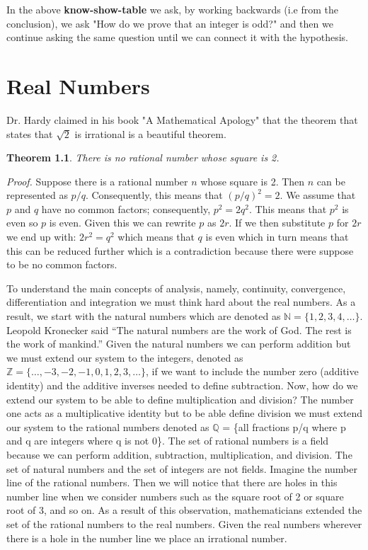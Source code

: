 \documentclass[10pt]{amsbook}
\newtheorem{theorem}{Theorem}
\begin{document}
In the above \textbf{know-show-table} we ask, by working backwards (i.e from the conclusion), we ask "How do we prove that an integer is odd?" and then we continue asking the same question until we can connect it with the hypothesis.




\chapter{Real Numbers}

 Dr. Hardy claimed in his book "A Mathematical Apology" that the theorem that states that $\sqrt{2}$ is irrational is a beautiful theorem.

\begin{theorem}
There is no rational number whose square is 2.
\end{theorem}
\textit{Proof.} Suppose there is a rational number $n$ whose square is 2. Then $n$ can be represented as $p/q$. Consequently, this means that $(p/q)^2 = 2$. We assume that $p$ and $q$ have no common factors; consequently, $p^2 = 2q^2$. This means that  $p^2$ is even so $p$ is even. Given this we can rewrite $p$ as $2r$. If we then substitute $p$ for $2r$ we end up with: $2r^2 = q^2$ which means that $q$ is even which in turn means that this can be reduced further which is a contradiction because there were suppose to be no common factors.

To understand the main concepts of analysis, namely, continuity, convergence, differentiation and integration we must think hard about the real numbers. As a result, we start with the natural numbers which are denoted as $\mathbb{N} = \{ 1,2,3,4, \dots \}$. Leopold Kronecker said “The natural numbers are the work of God. The rest is the work of mankind.” Given the natural numbers we can perform addition but we must extend our system to the integers, denoted as $\mathbb{Z} = \{\dots,-3,-2,-1,0,1,2,3, \dots \}$, if we want to include the number zero (additive identity) and the additive inverses needed to define subtraction. Now, how do we extend our system to be able to define multiplication and division? The number one acts as a multiplicative identity but to be able define division we must extend our system to the rational numbers denoted as  $\mathbb{Q}$ = \{all fractions p/q where p and q are integers where q is not 0\}. The set of rational numbers is a field because we can perform addition, subtraction, multiplication, and division. The set of natural numbers and the set of integers are not fields. Imagine the number line of the rational numbers. Then we will notice that there are holes in this number line when we consider numbers such as the square root of 2 or square root of 3, and so on. As a result of this observation, mathematicians extended the set of the rational numbers to the real numbers. Given the real numbers wherever there is a hole in the number line we place an irrational number.
\end{document}
